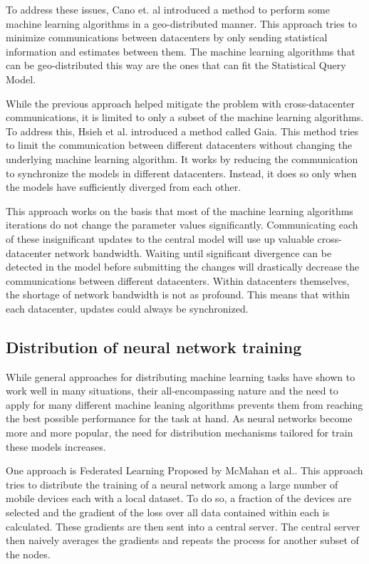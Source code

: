 \documentclass[11pt]{article}       %
\begin{document}
To address these issues, Cano et. al\cite{cano2016towards} introduced a method to perform some machine learning algorithms in a geo-distributed manner. This approach tries to minimize communications between datacenters by only sending statistical information and estimates between them. The machine learning algorithms that can be geo-distributed this way are the ones that can fit the Statistical Query Model\cite{kearns1998efficient}.

While the previous approach helped mitigate the problem with cross-datacenter communications, it is limited to only a subset of the machine learning algorithms. To address this, Hsieh et al.\cite{hsieh2017gaia} introduced a method called Gaia. This method tries to limit the communication between different datacenters without changing the underlying machine learning algorithm. It works by reducing the communication to synchronize the models in different datacenters. Instead, it does so only when the models have sufficiently diverged from each other.

This approach works on the basis that most of the machine learning algorithms iterations do not change the parameter values significantly. Communicating each of these insignificant updates to the central model will use up valuable cross-datacenter network bandwidth. Waiting until significant divergence can be detected in the model before submitting the changes will drastically decrease the communications between different datacenters. Within datacenters themselves, the shortage of network bandwidth is not as profound. This means that within each datacenter, updates could always be synchronized.

\subsection{Distribution of neural network training}

While general approaches for distributing machine learning tasks have shown to work well in many situations, their all-encompassing nature and the need to apply for many different machine leaning algorithms prevents them from reaching the best possible performance for the task at hand. As neural networks become more and more popular, the need for distribution mechanisms tailored for train these models increases.

One approach is Federated Learning Proposed by McMahan et al.\cite{BrendanMcMahan2017}. This approach tries to distribute the training of a neural network among a large number of mobile devices each with a local dataset. To do so, a fraction of the devices are selected and the gradient of the loss over all data contained within each is calculated. These gradients are then sent into a central server. The central server then naively averages the gradients and repeats the process for another subset of the nodes.
\end{document}
